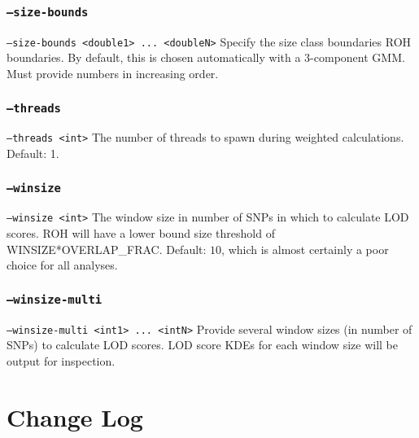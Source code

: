 \documentclass[12pt]{article}%
\begin{document}
\subsubsection{{\tt --size-bounds}}
{\tt --size-bounds <double1> ... <doubleN>} Specify the size class boundaries ROH boundaries. By default, this is chosen automatically with a 3-component GMM.  Must provide numbers in increasing order.

\subsubsection{{\tt --threads}}
{\tt --threads <int>} The number of threads to spawn during weighted calculations. Default: 1.

\subsubsection{{\tt --winsize}}
{\tt --winsize <int>} The window size in number of SNPs in which to calculate LOD scores. ROH will have a lower bound size threshold of WINSIZE*OVERLAP\_FRAC. Default: $10$, which is almost certainly a poor choice for all analyses.

\subsubsection{{\tt --winsize-multi}}
{\tt --winsize-multi <int1> ... <intN>} Provide several window sizes (in number of SNPs) to calculate LOD scores. LOD score KDEs for each window size will be output for inspection.

\section{Change Log}
\end{document}
